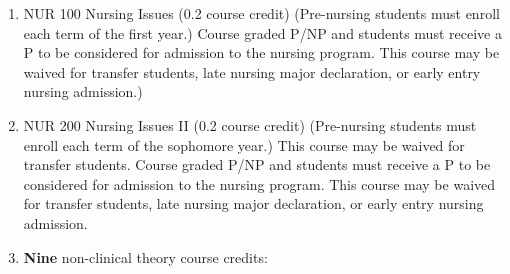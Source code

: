 \documentclass[
  letterpaper,
]{scrbook}
\providecommand{\tightlist}{%
  \setlength{\itemsep}{0pt}\setlength{\parskip}{0pt}}
\begin{document}
\begin{enumerate}
\begin{itemize}
    \begin{itemize}
    \tightlist
    \item
      PSY 300 Stat Methods and Data Analysis \textbf{\emph{OR}}\\
    \item
      STA 100 Statistical Reasoning I-Foundations \textbf{and} STA 110
      Stats IIA: Inferential Reasoning\\
    \end{itemize}
  \end{itemize}
\item
  NUR 100 Nursing Issues (0.2 course credit) (Pre-nursing students must
  enroll each term of the first year.) Course graded P/NP and students
  must receive a P to be considered for admission to the nursing
  program. This course may be waived for transfer students, late nursing
  major declaration, or early entry nursing admission.)\\
\item
  NUR 200 Nursing Issues II (0.2 course credit) (Pre-nursing students
  must enroll each term of the sophomore year.) This course may be
  waived for transfer students. Course graded P/NP and students must
  receive a P to be considered for admission to the nursing program.
  This course may be waived for transfer students, late nursing major
  declaration, or early entry nursing admission.\\
\item
  \textbf{Nine} non-clinical theory course credits:


\end{enumerate}
\end{document}
